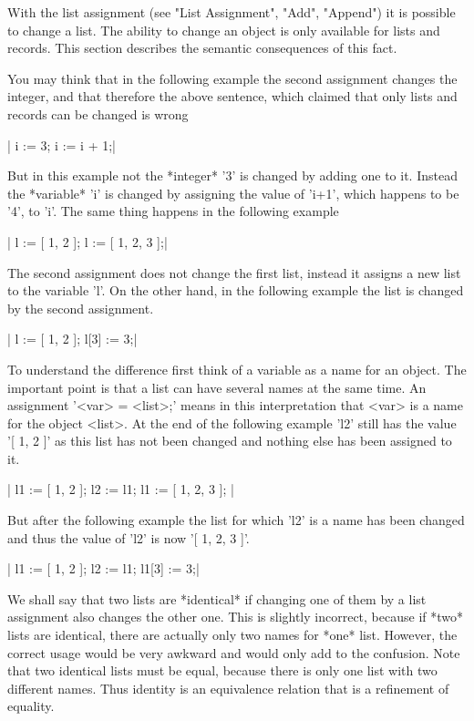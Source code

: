 
With the  list assignment (see "List  Assignment", "Add", "Append") it is
possible   to change a list.    The ability to   change an object is only
available  for  lists and records.  This   section describes the semantic
consequences of this fact.

You may think that in the following example the second assignment changes
the integer, and  that therefore the  above sentence, which claimed  that
only lists and records can be changed is wrong

|    i := 3;
    i :=  i + 1;|

But in this example not the *integer* '3' is changed by adding one to it.
Instead  the *variable*  'i'  is changed by assigning the value of 'i+1',
which happens to be '4', to 'i'.  The same thing happens in the following
example

|    l := [ 1,  2 ];
    l := [ 1, 2,  3 ];|

The second assignment does not change the first list, instead  it assigns
a new  list  to  the variable 'l'.   On the other hand,  in the following
example the  list  is changed by the second assignment.

|    l := [ 1,  2 ];
    l[3] := 3;|

To understand the difference  first think  of a variable as a name for an
object.  The important point is that a list can have several names at the
same  time.    An   assignment  '<var>   \:=   <list>;'  means  in   this
interpretation that <var> is a name for the object <list>.  At the end of
the following example  'l2' still  has the value '[ 1, 2 ]' as this  list
has not been changed and nothing else has been assigned to it.

|    l1 := [ 1, 2 ];
    l2 := l1;
    l1 := [ 1, 2, 3 ]; |

But  after  the following  example the list for which 'l2' is a  name has
been changed and thus the value of 'l2' is now '[ 1, 2, 3 ]'.

|    l1 := [ 1, 2 ];
    l2 := l1;
    l1[3] := 3;|

We shall say that two lists are *identical* if changing one of them  by a
list assignment also changes the other one.   This is slightly incorrect,
because if  *two* lists are identical,  there are actually only two names
for *one*  list.  However, the correct  usage  would be  very awkward and
would only add to the confusion.   Note that two  identical lists must be
equal, because  there is only  one list with  two  different names.  Thus
identity is an equivalence relation that is a refinement of equality.

